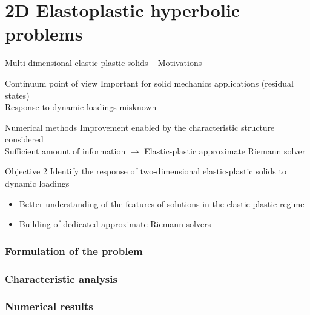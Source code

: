 \documentclass[11pt,aspectratio=169]{beamer}
\makeatletter
\let\oldpart\part
\def\part#1{\def\@currentlabelname{#1}\oldpart{#1}}
\makeatother
\begin{document}
\part{2D Elastoplastic hyperbolic problems}
\label{part:part2}
\begin{frame}{Multi-dimensional elastic-plastic solids -- Motivations}
  
  \begin{block}{Continuum point of view}
    Important for solid mechanics applications (residual states)\\
    Response to dynamic loadings misknown %
  \end{block}
  
  \begin{block}{Numerical methods}
    Improvement enabled by the characteristic structure considered \\
    Sufficient amount of information \alert{$\rightarrow$ Elastic-plastic approximate Riemann solver}
  \end{block}
  \pause
  \begin{block}{Objective 2}
    Identify the response of two-dimensional elastic-plastic solids to dynamic loadings
    \begin{itemize}
    \item Better understanding of the features of solutions in the elastic-plastic regime
    \item Building of dedicated approximate Riemann solvers
    \end{itemize}
  \end{block}
\end{frame}

\section{Formulation of the problem}


\section{Characteristic analysis}


\section{Numerical results}

\end{document}
